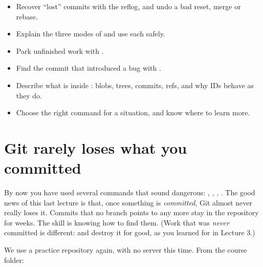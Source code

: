


\begin{goals}
\begin{itemize}
  \item Recover ``lost'' commits with the reflog, and undo a bad reset, merge or rebase.
  \item Explain the three modes of  and use each safely.
  \item Park unfinished work with .
  \item Find the commit that introduced a bug with .
  \item Describe what is inside : blobs, trees, commits, refs, and why IDs behave as they do.
  \item Choose the right command for a situation, and know where to learn more.
\end{itemize}
\end{goals}

\section{Git rarely loses what you committed}

By now you have used several commands that sound dangerous: , , , . The good news of this last lecture is that, once something is \emph{committed}, Git almost never really loses it. Commits that no branch points to any more stay in the repository for weeks. The skill is knowing how to find them. (Work that was \emph{never} committed is different:  and  destroy it for good, as you learned for  in Lecture 3.)

We use a practice repository again, with no server this time. From the course folder:

